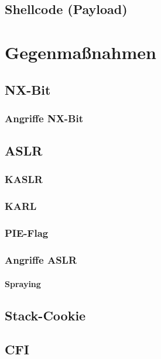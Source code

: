\documentclass[12pt]{book}
\begin{document}
\section{Shellcode (Payload)}

\chapter{Gegenmaßnahmen}

\section{NX-Bit}

\subsection{Angriffe NX-Bit}

\section{ASLR}

\subsection{KASLR}

\subsection{KARL}

\subsection{PIE-Flag}

\subsection{Angriffe ASLR}

\subsubsection{Spraying}

\section{Stack-Cookie}

\section{CFI}
\end{document}
